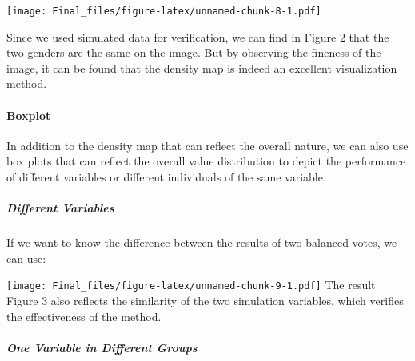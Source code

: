 \documentclass[
]{article}
\newenvironment{Shaded}{\begin{snugshade}}{\end{snugshade}}
\newcommand{\DataTypeTok}[1]{\textcolor[rgb]{0.13,0.29,0.53}{#1}}
\newcommand{\FloatTok}[1]{\textcolor[rgb]{0.00,0.00,0.81}{#1}}
\newcommand{\KeywordTok}[1]{\textcolor[rgb]{0.13,0.29,0.53}{\textbf{#1}}}
\newcommand{\NormalTok}[1]{#1}
\newcommand{\OperatorTok}[1]{\textcolor[rgb]{0.81,0.36,0.00}{\textbf{#1}}}
\newcommand{\StringTok}[1]{\textcolor[rgb]{0.31,0.60,0.02}{#1}}
\begin{document}
\texttt{[image: Final\_files/figure-latex/unnamed-chunk-8-1.pdf]}

Since we used simulated data for verification, we can find in Figure 2
that the two genders are the same on the image. But by observing the
fineness of the image, it can be found that the density map is indeed an
excellent visualization method.

\hypertarget{boxplot}{%
\paragraph{Boxplot}\label{boxplot}}

In addition to the density map that can reflect the overall nature, we
can also use box plots that can reflect the overall value distribution
to depict the performance of different variables or different
individuals of the same variable:

\hypertarget{different-variables}{%
\subparagraph{Different Variables}\label{different-variables}}

If we want to know the difference between the results of two balanced
votes, we can use:

\begin{Shaded}
\end{Shaded}

\texttt{[image: Final\_files/figure-latex/unnamed-chunk-9-1.pdf]} The
result Figure 3 also reflects the similarity of the two simulation
variables, which verifies the effectiveness of the method.

\hypertarget{one-variable-in-different-groups}{%
\subparagraph{One Variable in Different
Groups}\label{one-variable-in-different-groups}}
\end{document}
